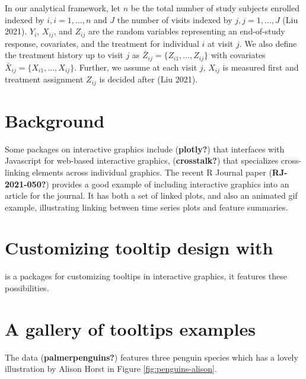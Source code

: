 In our analytical framework, let \(n\) be the total number of study subjects enrolled indexed by \(i, i = 1, \ldots, n\) and \(J\) the number of visits indexed by \(j, j = 1, \ldots, J\) (Liu 2021). \(Y_i\), \(X_{ij}\), and \(Z_{ij}\) are the random variables representing an end-of-study response, covariates, and the treatment for individual \(i\) at visit \(j\). We also define the treatment history up to visit \(j\) as \(\bar{Z}_{ij} = \{ Z_{i1}, \ldots, Z_{ij} \}\) with covariates \(\bar{X}_{ij} = \{ X_{i1}, \ldots, X_{ij} \}\). Further, we assume at each visit \(j\), \(X_{ij}\) is measured first and treatment assignment \(Z_{ij}\) is decided after (Liu 2021).

\section{Background}\label{background}

Some packages on interactive graphics include  (\textbf{plotly?}) that interfaces with Javascript for web-based interactive graphics,  (\textbf{crosstalk?}) that specializes cross-linking elements across individual graphics. The recent R Journal paper  (\textbf{RJ-2021-050?}) provides a good example of including interactive graphics into an article for the journal. It has both a set of linked plots, and also an animated gif example, illustrating linking between time series plots and feature summaries.

\section{\texorpdfstring{Customizing tooltip design with }{Customizing tooltip design with }}\label{customizing-tooltip-design-with}

 is a packages for customizing tooltips in interactive graphics, it features these possibilities.

\section{A gallery of tooltips examples}\label{a-gallery-of-tooltips-examples}

The  data (\textbf{palmerpenguins?}) features three penguin species which has a lovely illustration by Alison Horst in Figure \ref{fig:penguins-alison}.

